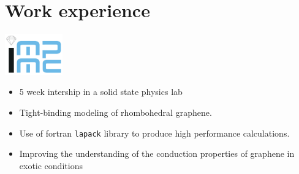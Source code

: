 \section{Work experience}

\begin{cv_content}
	\noindent
	\begin{minipage}{.15\textwidth}
		\centerline{\includegraphics[width=25mm]{img/impmc}}
	\end{minipage}%
	\hspace{5mm}
	\begin{minipage}{.8\textwidth}
		\raggedright
		\begin{itemize}
			\itemsep0em
			\item 5 week intership in a solid state physics lab
			\item Tight-binding modeling of rhombohedral graphene.
			\item Use of fortran \texttt{lapack} library to produce high performance calculations.
			\item Improving the understanding of the conduction properties of graphene in exotic conditions
		\end{itemize}
	\end{minipage}

\end{cv_content}

